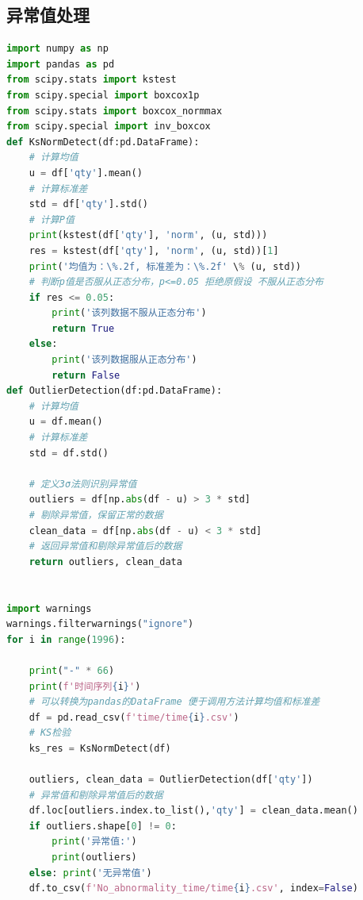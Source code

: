 \documentclass[withoutpreface,bwprint]{cumcmthesis}
\begin{document}
\subsection*{异常值处理}
\begin{lstlisting}[language=python]
import numpy as np
import pandas as pd
from scipy.stats import kstest
from scipy.special import boxcox1p
from scipy.stats import boxcox_normmax
from scipy.special import inv_boxcox
def KsNormDetect(df:pd.DataFrame):
    # 计算均值
    u = df['qty'].mean()
    # 计算标准差
    std = df['qty'].std()
    # 计算P值
    print(kstest(df['qty'], 'norm', (u, std)))
    res = kstest(df['qty'], 'norm', (u, std))[1]
    print('均值为：\%.2f, 标准差为：\%.2f' \% (u, std))
    # 判断p值是否服从正态分布，p<=0.05 拒绝原假设 不服从正态分布
    if res <= 0.05:
        print('该列数据不服从正态分布')
        return True
    else:
        print('该列数据服从正态分布')
        return False
def OutlierDetection(df:pd.DataFrame):
    # 计算均值
    u = df.mean()
    # 计算标准差
    std = df.std()

    # 定义3σ法则识别异常值
    outliers = df[np.abs(df - u) > 3 * std]
    # 剔除异常值，保留正常的数据
    clean_data = df[np.abs(df - u) < 3 * std]
    # 返回异常值和剔除异常值后的数据
    return outliers, clean_data


import warnings
warnings.filterwarnings("ignore")
for i in range(1996):

    print("-" * 66)
    print(f'时间序列{i}')
    # 可以转换为pandas的DataFrame 便于调用方法计算均值和标准差
    df = pd.read_csv(f'time/time{i}.csv')
    # KS检验
    ks_res = KsNormDetect(df)
    
    outliers, clean_data = OutlierDetection(df['qty'])
    # 异常值和剔除异常值后的数据
    df.loc[outliers.index.to_list(),'qty'] = clean_data.mean()
    if outliers.shape[0] != 0:
        print('异常值:')
        print(outliers)
    else: print('无异常值')
    df.to_csv(f'No_abnormality_time/time{i}.csv', index=False)
\end{lstlisting}
\end{document}
